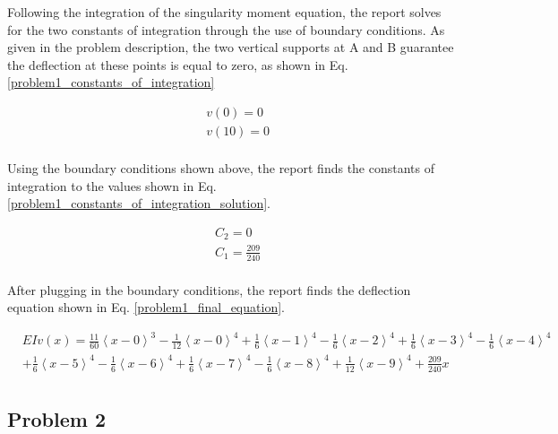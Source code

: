 \documentclass[a4paper]{article}
\begin{document}
Following the integration of the singularity moment equation, the report solves for the two constants of integration through the use of boundary conditions. As given in the problem description, the two vertical supports at A and B guarantee the deflection at these points is equal to zero, as shown in Eq. \ref{problem1_constants_of_integration}

\begin{equation}
\begin{split}
	& v(0) = 0 \\
	& v(10) = 0 \\
\end{split}
\label{problem1_constants_of_integration}
\end{equation}

Using the boundary conditions shown above, the report finds the constants of integration to the values shown in Eq. \ref{problem1_constants_of_integration_solution}.

\begin{equation}
\begin{split}
	& C_2 = 0 \\
	& C_1 = \frac{209}{240} \\
\end{split}
\label{problem1_constants_of_integration_solution}
\end{equation}

After plugging in the boundary conditions, the report finds the deflection equation shown in Eq. \ref{problem1_final_equation}.

\begin{equation}
\begin{split}
  & EI v(x) = \frac{11}{60}\left<x-0\right>^3 - \frac{1}{12}\left<x-0\right>^4 +  \frac{1}{6}\left<x-1\right>^4 - \frac{1}{6}\left<x-2\right>^4 + \frac{1}{6}\left<x-3\right>^4 - \frac{1}{6}\left<x-4\right>^4 \\  	  
&   +  \frac{1}{6}\left<x-5\right>^4 - \frac{1}{6}\left<x-6\right>^4  +  \frac{1}{6}\left<x-7\right>^4 - \frac{1}{6}\left<x-8\right>^4 +  \frac{1}{12}\left<x-9\right>^4 + \frac{209}{240}x\\
\end{split}
\label{problem1_final_equation}
\end{equation}



\subsection{Problem 2}
\end{document}
